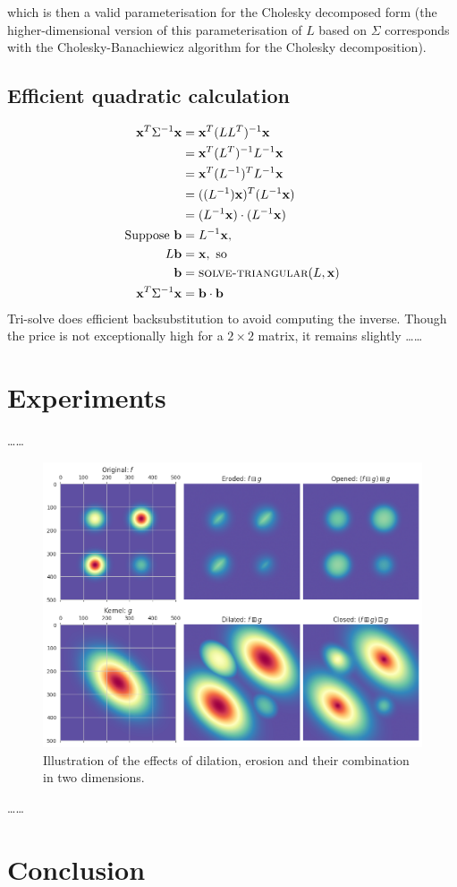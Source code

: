 \documentclass[a4paper, 12pt]{report}
\def\comment#1{\color{red}#1\color{black}}
\begin{document}
which is then a valid parameterisation for the Cholesky decomposed form  (the higher-dimensional version of this parameterisation of $L$ based on $\Sigma$ corresponds with the Cholesky-Banachiewicz algorithm for the Cholesky decomposition).

\section{Efficient quadratic calculation}
\begin{align*}
	\mathbf{x}^T\Sigma^{-1}\mathbf{x}
	&= \mathbf{x}^T(LL^T)^{-1}\mathbf{x}\\
	&= \mathbf{x}^T(L^T)^{-1}L^{-1}\mathbf{x}\\
	&= \mathbf{x}^T(L^{-1})^{T}L^{-1}\mathbf{x}\\
	&= ((L^{-1})\mathbf{x})^T(L^{-1}\mathbf{x})\\
	&= (L^{-1}\mathbf{x})\cdot(L^{-1}\mathbf{x})\\
\textrm{Suppose }\mathbf{b}&=L^{-1}\mathbf{x},\\
	L\mathbf{b}&=\mathbf{x}, \textrm{ so}\\
	\mathbf{b}&= \textsc{solve-triangular}(L, \mathbf{x})\\
	\mathbf{x}^T\Sigma^{-1}\mathbf{x} &= \mathbf{b}\cdot\mathbf{b}
\end{align*}
Tri-solve does efficient backsubstitution to avoid computing the inverse. Though the price is not exceptionally high for a $2\times2$ matrix, it remains slightly  \comment{\ldots\ldots}

\chapter{Experiments}
\comment{\ldots\ldots}
\begin{figure}[h!]
	\center
  \includegraphics[width=\textwidth]{figures/morphological_2d.png}
  \caption{Illustration of the effects of dilation, erosion and their combination in two dimensions.}
  \label{fig:dil-illust}
\end{figure}
\comment{\ldots\ldots}


\chapter{Conclusion}




\end{document}
